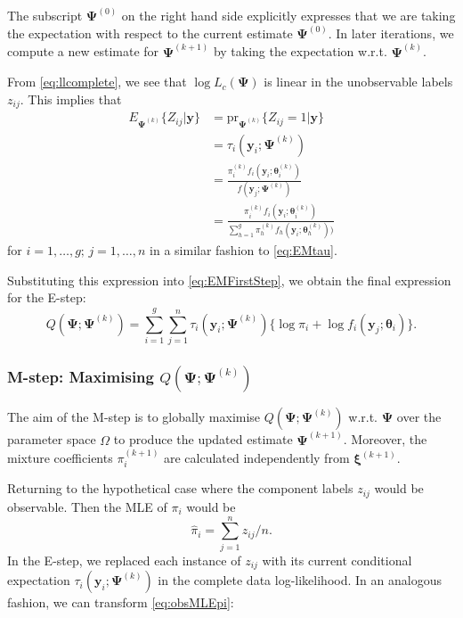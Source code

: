 \documentclass{article}\usepackage[]{graphicx}\usepackage[]{xcolor}
\theoremstyle{plain}
\theoremstyle{definition}
\theoremstyle{remark}
\newcommand{\boldy}{\mathbf{y}}
\newcommand{\boldtheta}{\boldsymbol{\theta}}
\newcommand{\boldPsi}{\boldsymbol{\Psi}}
\newcommand{\boldxi}{\boldsymbol{\xi}}
\begin{document}
The subscript $\boldPsi^{(0)}$ on the right hand side explicitly expresses that we are taking the expectation with respect to the current estimate $\boldPsi^{(0)}$. In later iterations, we compute a new estimate for  $\boldPsi^{(k+1)}$ by taking the expectation w.r.t. $\boldPsi^{(k)}$. 

From \eqref{eq:llcomplete}, we see that $\log L_c(\boldPsi)$ is linear in the unobservable labels $z_{ij}$. This implies that
\begin{align*}
  E_{\boldPsi^{(k)}} \{ Z_{ij} \vert \boldy\} &= \mathrm{pr}_{\boldPsi^{(k)}} \{Z_{ij} = 1 \vert \boldy \} \\
  &= \tau_i (\boldy_i ; \boldPsi^{(k)}) \\
  &= \frac{\pi_i^{(k)} f_i (\boldy_i;\boldtheta_i^{(k)})}{f(\boldy_j ; \boldPsi^{(k)})} \\
  &= \frac{\pi_i^{(k)} f_i (\boldy_i;\boldtheta_i^{(k)})}{\sum_{h=1}^g \pi_h^{(k)} f_h (\boldy_i;\boldtheta_h^{(k)}))}
\end{align*}
for $i=1, \dots, g; \, j=1, \dots, n$ in a similar fashion to \eqref{eq:EMtau}.

Substituting this expression into \eqref{eq:EMFirstStep}, we obtain the final expression for the E-step:
\begin{equation} \label{eq:EStep}
  Q(\boldPsi; \boldPsi^{(k)}) =  \sum_{i=1}^g \sum_{j=1}^n \tau_i (\boldy_i ; \boldPsi^{(k)}) \{ \log \pi_i + \log f_i (\boldy_j ; \boldtheta_i)\}.
\end{equation}

\subsubsection*{M-step: Maximising $Q(\boldPsi; \boldPsi^{(k)})$}

The aim of the M-step is to globally maximise $Q(\boldPsi; \boldPsi^{(k)})$ w.r.t. $\boldPsi$ over the parameter space $\Omega$ to produce the updated estimate $\boldPsi^{(k+1)}$. Moreover, the mixture coefficients $\pi_i^{(k+1)}$ are calculated independently from $\boldxi^{(k+1)}$.

Returning to the hypothetical case where the component labels $z_{ij}$ would be observable. Then the MLE of $\pi_i$ would be
\begin{equation}\label{eq:obsMLEpi}
  \hat{\pi}_i = \sum_{j=1}^n z_{ij} / n.
\end{equation}
In the E-step, we replaced each instance of $z_{ij}$ with its current conditional expectation $\tau_i (\boldy_i ; \boldPsi^{(k)})$ in the complete data log-likelihood. In an analogous fashion, we can transform \eqref{eq:obsMLEpi}:
\end{document}
